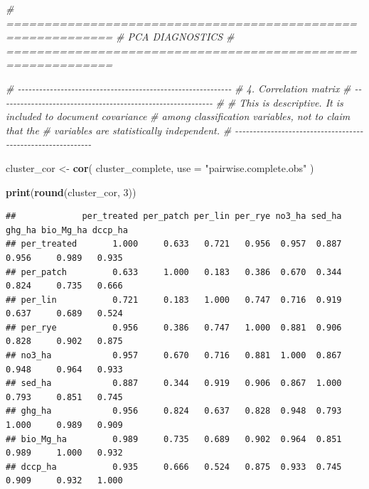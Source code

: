 \documentclass[
]{article}
\newenvironment{Shaded}{\begin{snugshade}}{\end{snugshade}}
\newcommand{\AttributeTok}[1]{\textcolor[rgb]{0.13,0.29,0.53}{#1}}
\newcommand{\CommentTok}[1]{\textcolor[rgb]{0.56,0.35,0.01}{\textit{#1}}}
\newcommand{\DecValTok}[1]{\textcolor[rgb]{0.00,0.00,0.81}{#1}}
\newcommand{\FunctionTok}[1]{\textcolor[rgb]{0.13,0.29,0.53}{\textbf{#1}}}
\newcommand{\NormalTok}[1]{#1}
\newcommand{\OtherTok}[1]{\textcolor[rgb]{0.56,0.35,0.01}{#1}}
\newcommand{\StringTok}[1]{\textcolor[rgb]{0.31,0.60,0.02}{#1}}
\begin{document}
\begin{Shaded}
\begin{Highlighting}[]
\CommentTok{\# ============================================================}
\CommentTok{\# PCA DIAGNOSTICS}
\CommentTok{\# ============================================================}

\CommentTok{\# {-}{-}{-}{-}{-}{-}{-}{-}{-}{-}{-}{-}{-}{-}{-}{-}{-}{-}{-}{-}{-}{-}{-}{-}{-}{-}{-}{-}{-}{-}{-}{-}{-}{-}{-}{-}{-}{-}{-}{-}{-}{-}{-}{-}{-}{-}{-}{-}{-}{-}{-}{-}{-}{-}{-}{-}{-}{-}{-}{-}}
\CommentTok{\# 4. Correlation matrix}
\CommentTok{\# {-}{-}{-}{-}{-}{-}{-}{-}{-}{-}{-}{-}{-}{-}{-}{-}{-}{-}{-}{-}{-}{-}{-}{-}{-}{-}{-}{-}{-}{-}{-}{-}{-}{-}{-}{-}{-}{-}{-}{-}{-}{-}{-}{-}{-}{-}{-}{-}{-}{-}{-}{-}{-}{-}{-}{-}{-}{-}{-}{-}}
\CommentTok{\#}
\CommentTok{\# This is descriptive. It is included to document covariance}
\CommentTok{\# among classification variables, not to claim that the}
\CommentTok{\# variables are statistically independent.}
\CommentTok{\# {-}{-}{-}{-}{-}{-}{-}{-}{-}{-}{-}{-}{-}{-}{-}{-}{-}{-}{-}{-}{-}{-}{-}{-}{-}{-}{-}{-}{-}{-}{-}{-}{-}{-}{-}{-}{-}{-}{-}{-}{-}{-}{-}{-}{-}{-}{-}{-}{-}{-}{-}{-}{-}{-}{-}{-}{-}{-}{-}{-}}

\NormalTok{cluster\_cor }\OtherTok{\textless{}{-}} \FunctionTok{cor}\NormalTok{(}
\NormalTok{  cluster\_complete,}
  \AttributeTok{use =} \StringTok{"pairwise.complete.obs"}
\NormalTok{)}

\FunctionTok{print}\NormalTok{(}\FunctionTok{round}\NormalTok{(cluster\_cor, }\DecValTok{3}\NormalTok{))}
\end{Highlighting}
\end{Shaded}

\begin{verbatim}
##             per_treated per_patch per_lin per_rye no3_ha sed_ha ghg_ha bio_Mg_ha dccp_ha
## per_treated       1.000     0.633   0.721   0.956  0.957  0.887  0.956     0.989   0.935
## per_patch         0.633     1.000   0.183   0.386  0.670  0.344  0.824     0.735   0.666
## per_lin           0.721     0.183   1.000   0.747  0.716  0.919  0.637     0.689   0.524
## per_rye           0.956     0.386   0.747   1.000  0.881  0.906  0.828     0.902   0.875
## no3_ha            0.957     0.670   0.716   0.881  1.000  0.867  0.948     0.964   0.933
## sed_ha            0.887     0.344   0.919   0.906  0.867  1.000  0.793     0.851   0.745
## ghg_ha            0.956     0.824   0.637   0.828  0.948  0.793  1.000     0.989   0.909
## bio_Mg_ha         0.989     0.735   0.689   0.902  0.964  0.851  0.989     1.000   0.932
## dccp_ha           0.935     0.666   0.524   0.875  0.933  0.745  0.909     0.932   1.000
\end{verbatim}
\end{document}
